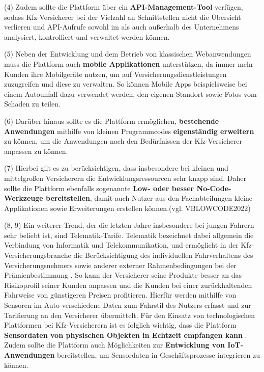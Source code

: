 (4) Zudem sollte die Plattform über ein \textbf{API-Management-Tool} verfügen, sodass Kfz-Versicherer bei der Vielzahl an Schnittstellen nicht die Übersicht verlieren und API-Aufrufe sowohl im als auch außerhalb des Unternehmens analysiert, kontrolliert und verwaltet werden können. \autocite[Vgl.][S. 67ff]{HANSCHKE2021}

(5) Neben der Entwicklung und dem Betrieb von klassischen Webanwendungen muss die Plattform auch \textbf{mobile Applikationen} unterstützen, da immer mehr Kunden ihre Mobilgeräte nutzen, um auf Versicherungsdienstleistungen zuzugreifen und diese zu verwalten. So können Mobile Apps beispielsweise bei einem Autounfall dazu verwendet werden, den eigenen Standort sowie Fotos vom Schaden zu teilen. \autocite[Vgl.][S. 7]{HU2020}

(6) Darüber hinaus sollte es die Plattform ermöglichen, \textbf{bestehende Anwendungen} mithilfe von kleinen Programmcodes \textbf{eigenständig erweitern} zu können, um die Anwendungen nach den Bedürfnissen der Kfz-Versicherer anpassen zu können. \autocite[Vgl.][]{WEINGARTNER2023}

(7) Hierbei gilt es zu berücksichtigen, dass insbesondere bei kleinen und mittelgroßen Versicherern die Entwicklungsressourcen sehr knapp sind. Daher sollte die Plattform ebenfalls sogenannte \textbf{Low- oder besser No-Code-Werkzeuge bereitstellen}, damit auch Nutzer aus den Fachabteilungen kleine Applikationen sowie Erweiterungen erstellen können.(vgl. VBLOWCODE2022) \autocite[Vgl.][]{VBLOWCODE2022}

(8, 9) Ein weiterer Trend, der die letzten Jahre insbesondere bei jungen Fahrern sehr beliebt ist, sind Telematik-Tarife. Telematik bezeichnet dabei allgemein die Verbindung von Informatik und Telekommunikation, \autocite[Vgl.][S. 10-11]{ABTS2017} und ermöglicht in der Kfz-Versicherungsbranche die Berücksichtigung des individuellen Fahrverhaltens des Versicherungsnehmers sowie anderer externer Rahmenbedingungen bei der Prämienbestimmung \autocite[Vgl.][S. 84]{MERZINGER2017}. So kann der Versicherer seine Produkte besser an das Risikoprofil seiner Kunden anpassen und die Kunden bei einer zurückhaltenden Fahrweise von günstigeren Preisen profitieren. Hierfür werden mithilfe von Sensoren im Auto verschiedene Daten zum Fahrstil des Nutzers erfasst und zur Tarifierung an den Versicherer übermittelt. \autocite[Vgl.][S. 3-4]{ELING2020} Für den Einsatz von technologischen Plattformen bei Kfz-Versicherern ist es folglich wichtig, dass die Plattform \textbf{Sensordaten von physischen Objekten in Echtzeit empfangen kann} \autocite[Vgl.][S. 10-15]{WEICHERT2015}. Zudem sollte die Plattform auch Möglichkeiten zur \textbf{Entwicklung von IoT-Anwendungen} bereitstellen, um Sensordaten in Geschäftsprozesse integrieren zu können. 

